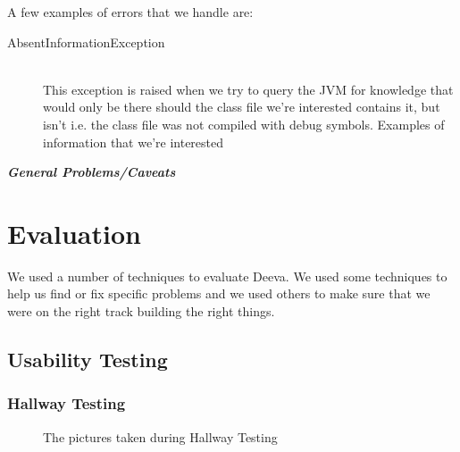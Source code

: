 \documentclass[11pt, a4paper]{article}
\begin{document}
A few examples of errors that we handle are:
\begin{description}
  \item[AbsentInformationException]\hfill\\
    This exception is raised when we try to query the JVM for knowledge that would only be there should the class file we're interested contains it, but isn't i.e. the class file was not compiled with debug symbols.
    Examples of information that we're interested 
\end{description}

\textbf{\emph{General Problems/Caveats}}\\


\section{Evaluation}
\label{sec:evaluation}
We used a number of techniques to evaluate Deeva.
We used some techniques to help us find or fix specific problems and we used others to make sure that we were on the right track building the right things.
\subsection{Usability Testing}

\subsubsection{Hallway Testing}
\begin{figure}[h!]
\centering
{}
\quad
{}
\caption{The pictures taken during Hallway Testing}
\label{fig:hallway}
\end{figure}
\end{document}
